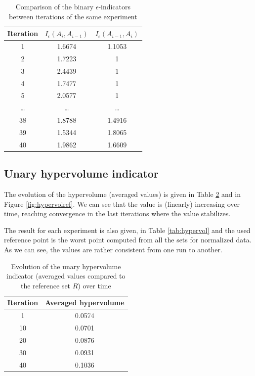 \begin{table}[h!]
\begin{center}
\begin{tabular}{|c|c|c|}
\hline Iteration & $I_\epsilon(A_i, A_{i-1})$ & $I_\epsilon(A_{i-1}, A_i)$ \\ 
\hline 1 & 1.6674 & 1.1053 \\ 
\hline 2 & 1.7223 & 1 \\ 
\hline 3 & 2.4439 & 1 \\ 
\hline 4 & 1.7477 & 1 \\ 
\hline 5 & 2.0577 & 1 \\ 
\hline \dots & \dots & \dots \\
\hline 38 & 1.8788 & 1.4916 \\
\hline 39 & 1.5344 & 1.8065 \\ 
\hline 40 & 1.9862 & 1.6609 \\
\hline 
\end{tabular} 
\end{center}
\caption{Comparison of the binary $\epsilon$-indicators between iterations of the same experiment}
\label{tab:biepsiter}
\end{table}

\subsection{Unary hypervolume indicator}
The evolution of the hypervolume (averaged values) is given in Table \ref{tab:hypervolref} and in Figure \ref{fig:hypervolref}. We can see that the value is (linearly) increasing over time, reaching convergence in the last iterations where the value stabilizes.

The result for each experiment is also given, in Table \ref{tab:hypervol} and the used reference point is the worst point computed from all the sets for normalized data. As we can see, the values are rather consistent from one run to another.

\begin{table}[h!]
\begin{center}
\begin{tabular}{|c|c|}
\hline Iteration & Averaged hypervolume \\
\hline 1 & 0.0574 \\
\hline 10 & 0.0701 \\
\hline 20 & 0.0876 \\
\hline 30 & 0.0931 \\
\hline 40 & 0.1036 \\
\hline
\end{tabular}
\end{center}
\caption{Evolution of the unary hypervolume indicator (averaged values compared to the reference set $R$) over time}
\label{tab:hypervolref}
\end{table}

